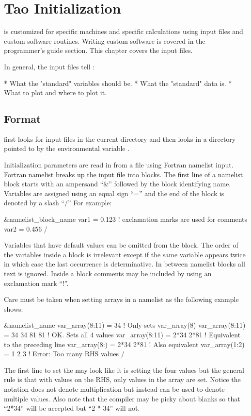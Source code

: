 \chapter{Tao Initialization}
\label{c:init}

\tao is customized for specific machines and specific calculations
using input files and custom software routines. Writing custom
software is covered in the programmer's guide section. This chapter
covers the input files.

In general, the input files tell \tao:
\begin{example}
  * What the "standard" variables should be.
  * What the "standard" data is.
  * What to plot and where to plot it.
\end{example}

\section{Format}
\label{s:format}

\tao first looks for input files in the current directory and then
looks in a directory pointed to by the environmental variable
.

Initialization parameters are read in from a file using Fortran
namelist input. Fortran namelist breaks up the input file into
blocks. The first line of a namelist block starts with an ampersand
``\&'' followed by the block identifying name. Variables are assigned
using an equal sign ``='' and the end of the block is denoted by a
slash ``/'' For example:
\begin{example}
  &namelist_block_name
    var1 = 0.123   ! exclamation marks are used for comments
    var2 = 0.456
  /
\end{example}
Variables that have default values can be omitted from the block.  The
order of the variables inside a block is irrelevant except if the
same variable appears twice in which case the last occurrence is determinative.
In between namelist blocks all text is ignored. Inside a block comments may be
included by using an exclamation mark ``!''.

Care must be taken when setting arrays in a namelist as the following example
shows:
\begin{example}
  &namelist_name
    var_array(8:11) = 34             ! Only sets var_array(8)
    var_array(8:11) = 34 34 81 81    ! OK. Sets all 4 values
    var_array(8:11) = 2*34 2*81      ! Equivalent to the preceding line
    var_array(8:)   = 2*34 2*81      ! Also equivalent
    var_array(1:2) = 1 2 3           ! Error: Too many RHS values
  /
\end{example}
The first line to set the  may look like it is setting 
the four values  but the general rule is that with 
values on the RHS, only  values in the array are set. Notice the notation
 does not denote multiplication but instead can be used to denote
multiple values. Also note that the compiler may be picky about blanks so 
that ``2*34'' will be accepted but ``2 * 34'' will not.

